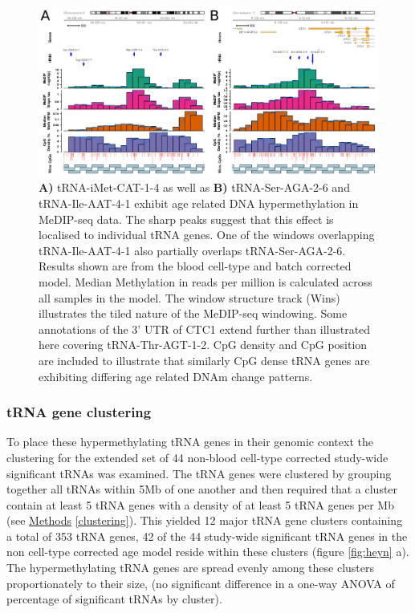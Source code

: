 \documentclass[
]{book}
\begin{document}
\begin{figure}

{\centering \includegraphics[width=1\linewidth]{figs/gviz_iMet-CAT-1-4_Ser-AGA-2-6_3k_white_bigger} 

}

\caption{\textbf{A)} tRNA-iMet-CAT-1-4 as well as \textbf{B)} tRNA-Ser-AGA-2-6 and tRNA-Ile-AAT-4-1 exhibit age related DNA hypermethylation in MeDIP-seq data. The sharp peaks suggest that this effect is localised to individual tRNA genes. One of the windows overlapping tRNA-Ile-AAT-4-1 also partially overlaps tRNA-Ser-AGA-2-6. Results shown are from the blood cell-type and batch corrected model. Median Methylation in reads per million is calculated across all samples in the model. The window structure track (Wins) illustrates the tiled nature of the MeDIP-seq windowing. Some annotations of the 3' UTR of CTC1 extend further than illustrated here covering tRNA-Thr-AGT-1-2. CpG density and CpG position are included to illustrate that similarly CpG dense tRNA genes are exhibiting differing age related DNAm change patterns.}\label{fig:gvizLocusZooms}
\end{figure}



\hypertarget{trna-gene-clustering}{%
\subsubsection{tRNA gene clustering}\label{trna-gene-clustering}}

To place these hypermethylating tRNA genes in their genomic context the clustering for the extended set of 44 non-blood cell-type corrected study-wide significant tRNAs was examined.
The tRNA genes were clustered by grouping together all tRNAs within 5Mb of one another and then required that a cluster contain at least 5 tRNA genes with a density of at least 5 tRNA genes per Mb (see \protect\hyperlink{clustering}{Methods} \ref{clustering}).
This yielded 12 major tRNA gene clusters containing a total of 353 tRNA genes, 42 of the 44 study-wide significant tRNA genes in the non cell-type corrected age model reside within these clusters (figure \ref{fig:heyn} a).
The hypermethylating tRNA genes are spread evenly among these clusters proportionately to their size, (no significant difference in a one-way ANOVA of percentage of significant tRNAs by cluster).
\end{document}
